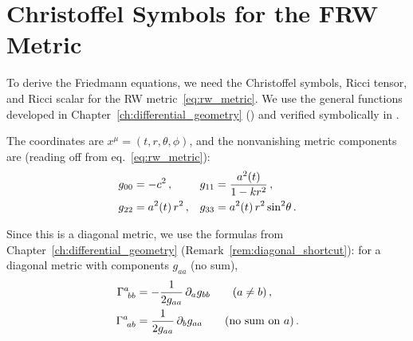\section{Christoffel Symbols for the FRW Metric}
\label{sec:frw_christoffel}

To derive the Friedmann equations, we need the Christoffel symbols,
Ricci tensor, and Ricci scalar for the RW metric~\eqref{eq:rw_metric}.
We use the general functions developed in Chapter~\ref{ch:differential_geometry}
()
and verified symbolically in
.

The coordinates are $x^\mu = (t, r, \theta, \phi)$, and the nonvanishing
metric components are (reading off from eq.~\eqref{eq:rw_metric}):
\begin{align}
    g_{00} &= -c^2 \,, &
    g_{11} &= \frac{a^2(t)}{1 - kr^2} \,, \nonumber \\
    g_{22} &= a^2(t)\, r^2 \,, &
    g_{33} &= a^2(t)\, r^2 \sin^2\!\theta \,.
    \label{eq:frw_metric_components}
\end{align}

Since this is a diagonal metric, we use the formulas from Chapter~\ref{ch:differential_geometry}
(Remark~\ref{rem:diagonal_shortcut}): for a diagonal metric with components $g_{aa}$ (no sum),
\begin{align}
    \Gamma^{a}_{\ b b} &= -\frac{1}{2g_{aa}}\, \partial_a g_{bb}
    \qquad (a \neq b) \,, \nonumber \\
    \Gamma^{a}_{\ a b} &= \frac{1}{2g_{aa}}\, \partial_b g_{aa}
    \qquad (\text{no sum on } a) \,.
    \label{eq:diagonal_christoffel}
\end{align}

